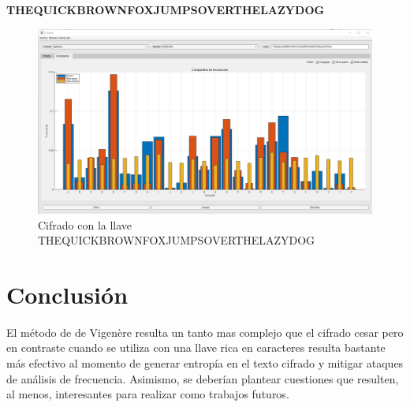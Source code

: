 \documentclass[10pt]{article}
\begin{document}
\textbf{THEQUICKBROWNFOXJUMPSOVERTHELAZYDOG}

\begin{figure}[!ht]
  \centering
  \includegraphics[width=1\textwidth]{Vigenere_THEQUICKBROWNFOXJUMPSOVERTHELAZYDOG.jpg}
  \caption{Cifrado con la llave THEQUICKBROWNFOXJUMPSOVERTHELAZYDOG}
  \label{fig_sim}
\end{figure}

\par\vspace{\baselineskip}
\newpage

\section{Conclusión}
\justify
El método de de Vigenère resulta un tanto mas complejo que el cifrado cesar pero en contraste cuando se utiliza con una llave rica en caracteres resulta bastante más efectivo al momento de generar entropía en el texto cifrado y mitigar ataques de análisis de frecuencia.
Asimismo, se deberían plantear cuestiones que resulten, al menos, interesantes para
realizar como trabajos futuros.

 
 

\par\vspace{\baselineskip}
\end{document}
